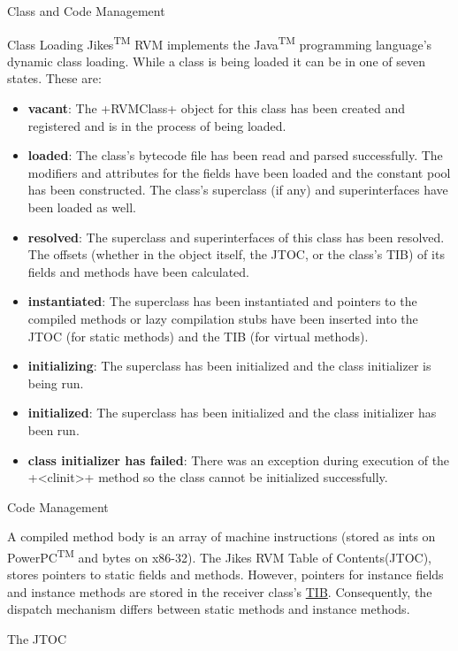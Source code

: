\begin{section}{Class and Code Management}
\begin{subsection}{Class Loading}
Jikes\textsuperscript{TM} RVM implements the Java\textsuperscript{TM} programming language's dynamic class loading. While a class is being loaded it can be in one of seven states. These are:
\begin{itemize}
  \item \textbf{vacant}: The \spverb+RVMClass+ object for this class has been created and registered and is in the process of being loaded.
  \item \textbf{loaded}: The class's bytecode file has been read and parsed successfully. The modifiers and attributes for the fields have been loaded and the constant pool has been constructed. The class's superclass (if any) and superinterfaces have been loaded as well.
  \item \textbf{resolved}: The superclass and superinterfaces of this class has been resolved. The offsets (whether in the object itself, the JTOC, or the class's TIB) of its fields and methods have been calculated.
  \item \textbf{instantiated}: The superclass has been instantiated and pointers to the compiled methods or lazy compilation stubs have been inserted into the JTOC (for static methods) and the TIB (for virtual methods).
  \item \textbf{initializing}: The superclass has been initialized and the class initializer is being run.
  \item \textbf{initialized}: The superclass has been initialized and the class initializer has been run.
  \item \textbf{class initializer has failed}: There was an exception during execution of the \spverb+<clinit>+ method so the class cannot be initialized successfully.
\end{itemize}

\end{subsection}

\begin{subsection}{Code Management}

A compiled method body is an array of machine instructions (stored as ints on PowerPC\textsuperscript{TM} and bytes on x86-32). The Jikes RVM Table of Contents(JTOC), stores pointers to static fields and methods. However, pointers for instance fields and instance methods are stored in the receiver class's \hyperref[sec:objectmodel]{TIB}. Consequently, the dispatch mechanism differs between static methods and instance methods.

\begin{subsubsection}{The JTOC}


\end{subsubsection}
\end{subsection}
\end{section}
